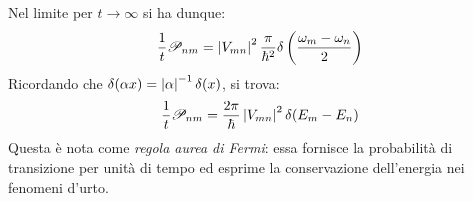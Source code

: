 Nel limite per $ t \rightarrow \infty $ si ha dunque:
\begin{equation*}
	\frac{1}{t} \mathscr{P}_{nm} = \left\lvert V_{mn}\right\rvert^2 \frac{\pi}{\hbar^2} \delta \left( \frac{\omega_m - \omega_n}{2} \right)
\end{equation*}
Ricordando che $ \delta(\alpha x) = \left\lvert\alpha\right\rvert^{-1} \delta(x) $, si trova:
\begin{equation}
	\frac{1}{t} \mathscr{P}_{nm} = \frac{2\pi}{\hbar} \left\lvert V_{mn}\right\rvert^2 \delta(E_m - E_n)
	\label{eq:5.25}
\end{equation}
Questa è nota come \textit{regola aurea di Fermi}: essa fornisce la probabilità di transizione per unità di tempo ed esprime la conservazione dell'energia nei fenomeni d'urto.










